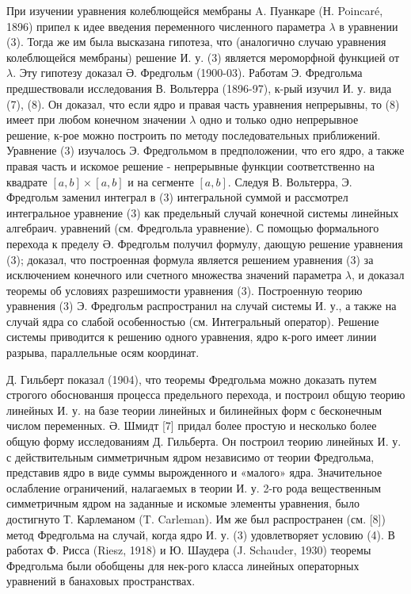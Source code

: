 \documentclass[10pt]{article}
\begin{document}
При изучении уравнения колеблющейся мембраны A. Пуанкаре (Н. Poincaré, 1896) припел к идее введения переменного численного параметра $\lambda$ в уравнении (3). Тогда же им была высказана гипотеза, что (аналогично случаю уравнения колеблющейся мембраны) решение И. у. (3) является мероморфной функцией от $\lambda$. Эту гипотезу доказал Ә. Фредгольм (1900-03). Работам Э. Фредгольма предшествовали исследования В. Вольтерра (1896-97), к-рый изучил И. у. вида (7), (8). Он доказал, что если ядро и правая часть уравнения непрерывны, то (8) имеет при любом конечном значении $\lambda$ одно и только одно непрерывное решение, к-рое можно построить по методу последовательных приближений. Уравнение (3) изучалось Э. Фредгольмом в предположении, что его ядро, а также правая часть и искомое решение - непрерывные функции соответственно на квадрате $[a, b] \times[a, b]$ и на сегменте $[a, b]$. Следуя В. Вольтерра, Э. Фредгольм заменил интеграл в (3) интегральной суммой и рассмотрел интегральное уравнение (3) как предельный случай конечной системы линейных алгебраич. уравнений (см. Фредгольла уравнение). С помощью формального перехода к пределу Ә. Фредгольм получил формулу, дающую решение уравнения (3); доказал, что построенная формула является решением уравнения (3) за исключением конечного или счетного множества значений параметра $\lambda$, и доказал теоремы об условиях разрешимости уравнения (3). Построенную теорию уравнения (3) Э. Фредгольм распространил на случай системы И. у., а также на случай ядра со слабой особенностью (см. Интегральный оператор). Решение системы приводится к решению одного уравнения, ядро к-рого имеет линии разрыва, параллельные осям координат.



Д. Гильберт показал (1904), что теоремы Фредгольма можно доказать путем строгого обоснованшя процесса предельного перехода, и построил общую теорию линейных И. у. на базе теории линейных и билинейных форм с бесконечным числом переменных. Ә. Шмидт [7] придал более простую и несколько более общую форму исследованиям Д. Гильберта. Он построил теорию линейных И. у. с действительным симметричным ядром независимо от теории Фредгольма, представив ядро в виде суммы вырожденного и «малого» ядра. Значительное ослабление ограничений, налагаемых в теории И. у. 2-го рода вещественным симметричным ядром на заданные и искомые элементы уравнения, было достигнуто Т. Карлеманом (T. Carleman). Им же был распространен (см. [8]) метод Фредгольма на случай, когда ядро И. у. (3) удовлетворяет условию (4). В работах Ф. Рисса (Riesz, 1918) и Ю. Шаудера (J. Schauder, 1930) теоремы Фредгольма были обобщены для нек-рого класса линейных операторных уравнений в банаховых пространствах.
\end{document}
